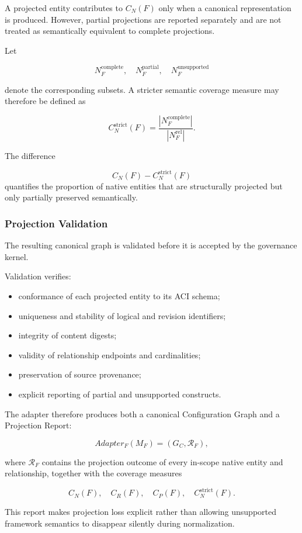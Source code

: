 \documentclass[10pt]{article}
\begin{document}
A projected entity contributes to $C_N(F)$ only when a canonical representation
is produced. However, partial projections are reported separately and are not
treated as semantically equivalent to complete projections.

Let

\begin{equation}
N_F^{\mathrm{complete}},
\quad
N_F^{\mathrm{partial}},
\quad
N_F^{\mathrm{unsupported}}
\label{eq:proj_entity_state_repr}
\end{equation}

denote the corresponding subsets. A stricter semantic coverage measure may
therefore be defined as

\[
C_N^{\mathrm{strict}}(F)
=
\frac{
	|N_F^{\mathrm{complete}}|
}{
	|N_F^{\mathrm{rel}}|
}.
\]

The difference

\[
C_N(F)-C_N^{\mathrm{strict}}(F)
\]
quantifies the proportion of native entities that are structurally projected
but only partially preserved semantically.

\subsubsection{Projection Validation}

The resulting canonical graph is validated before it is accepted by the
governance kernel.

Validation verifies:

\begin{itemize}
	\item conformance of each projected entity to its ACI schema;
	\item uniqueness and stability of logical and revision identifiers;
	\item integrity of content digests;
	\item validity of relationship endpoints and cardinalities;
	\item preservation of source provenance;
	\item explicit reporting of partial and unsupported constructs.
\end{itemize}

The adapter therefore produces both a canonical Configuration Graph and a
Projection Report:

\[
	Adapter_F(M_F)
	=
	(G_C,\mathcal{R}_F),
\]

where $\mathcal{R}_F$ contains the projection outcome of every in-scope native
entity and relationship, together with the coverage measures

\[
C_N(F),\quad
C_R(F),\quad
C_P(F),\quad
C_N^{\mathrm{strict}}(F).
\]

This report makes projection loss explicit rather than allowing unsupported
framework semantics to disappear silently during normalization.



\end{document}

